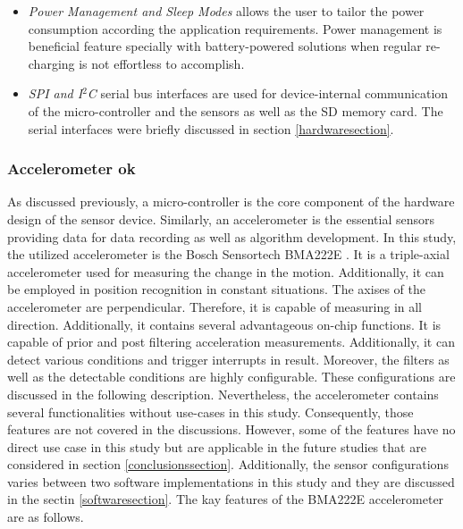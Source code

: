 \documentclass[english,12pt,a4paper,pdftex,elec,utf8]{aaltothesis}
\begin{document}
\begin{itemize}
\item \textit{Power Management and Sleep Modes} allows the user to tailor the power consumption according the application requirements. Power management is beneficial feature specially with battery-powered solutions when regular re-charging is not effortless to accomplish.

\item \textit{SPI and I$^2$C} serial bus interfaces are used for device-internal communication of the micro-controller and the sensors as well as the SD memory card. The serial interfaces were briefly discussed in section \ref{hardwaresection}.

\end{itemize}

\subsubsection*{Accelerometer ok}

As discussed previously, a micro-controller is the core component of the hardware design of the sensor device. Similarly, an accelerometer is the essential sensors providing data for data recording as well as algorithm development. In this study, the utilized accelerometer is the Bosch Sensortech BMA222E \cite{bma222datasheet}. It is a triple-axial accelerometer used for measuring the change in the motion. Additionally, it can be employed in position recognition in constant situations. The axises of the accelerometer are perpendicular. Therefore, it is capable of measuring in all direction. Additionally, it contains several advantageous on-chip functions. It is capable of prior and post filtering acceleration measurements. Additionally, it can detect various conditions and trigger interrupts in result. Moreover, the filters as well as the detectable conditions are highly configurable. These configurations are discussed in the following description. Nevertheless, the accelerometer contains several functionalities without use-cases in this study. Consequently, those features are not covered in the discussions. However, some of the features have no direct use case in this study but are applicable in the future studies that are considered in section \ref{conclusionssection}. Additionally, the sensor configurations varies between two software implementations in this study and they are discussed in the sectin \ref{softwaresection}. The kay features of the BMA222E accelerometer are as follows.
\end{document}
